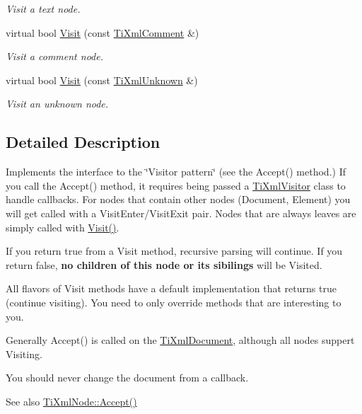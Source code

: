 \begin{DoxyCompactItemize}
\begin{DoxyCompactList}\small\item\em Visit a text node. \end{DoxyCompactList}\item 
virtual bool \hyperlink{class_ti_xml_visitor_a53a60e7a528627b31af3161972cc7fa2}{Visit} (const \hyperlink{class_ti_xml_comment}{Ti\+Xml\+Comment} \&)
\begin{DoxyCompactList}\small\item\em Visit a comment node. \end{DoxyCompactList}\item 
virtual bool \hyperlink{class_ti_xml_visitor_a7e284d607d275c51dac1adb58159ce28}{Visit} (const \hyperlink{class_ti_xml_unknown}{Ti\+Xml\+Unknown} \&)
\begin{DoxyCompactList}\small\item\em Visit an unknown node. \end{DoxyCompactList}\end{DoxyCompactItemize}


\subsection{Detailed Description}
Implements the interface to the \char`\"{}\+Visitor pattern\char`\"{} (see the Accept() method.) If you call the Accept() method, it requires being passed a \hyperlink{class_ti_xml_visitor}{Ti\+Xml\+Visitor} class to handle callbacks. For nodes that contain other nodes (Document, Element) you will get called with a Visit\+Enter/\+Visit\+Exit pair. Nodes that are always leaves are simply called with \hyperlink{class_ti_xml_visitor_afad71c71ce6473fb9b4b64cd92de4a19}{Visit()}.

If you return \textquotesingle{}true\textquotesingle{} from a Visit method, recursive parsing will continue. If you return false, {\bfseries no children of this node or its sibilings} will be Visited.

All flavors of Visit methods have a default implementation that returns \textquotesingle{}true\textquotesingle{} (continue visiting). You need to only override methods that are interesting to you.

Generally Accept() is called on the \hyperlink{class_ti_xml_document}{Ti\+Xml\+Document}, although all nodes suppert Visiting.

You should never change the document from a callback.

\begin{DoxySeeAlso}{See also}
\hyperlink{class_ti_xml_node_acc0f88b7462c6cb73809d410a4f5bb86}{Ti\+Xml\+Node\+::\+Accept()} 
\end{DoxySeeAlso}


